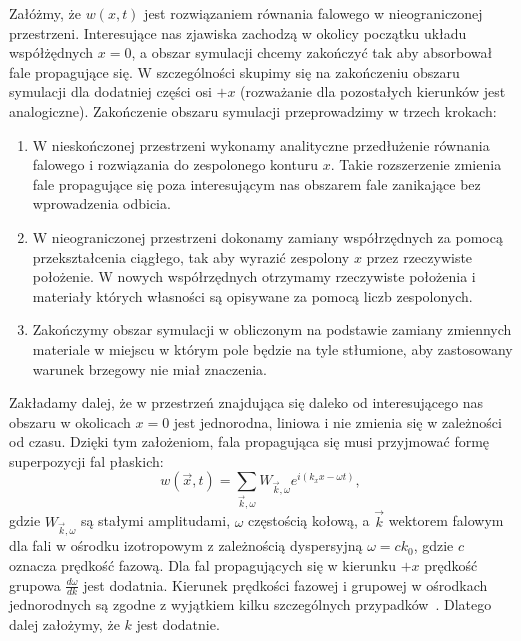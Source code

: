 Załóżmy, że $w(x,t)$ jest rozwiązaniem równania falowego w nieograniczonej przestrzeni. Interesujące nas zjawiska zachodzą w okolicy początku układu współżędnych $x=0$, a obszar symulacji chcemy zakończyć tak aby absorbował fale propagujące się. W szczególności skupimy się na zakończeniu obszaru symulacji dla dodatniej części osi $+x$ (rozważanie dla pozostałych kierunków jest analogiczne). Zakończenie obszaru symulacji przeprowadzimy w trzech krokach:
\begin{enumerate}
	\item W nieskończonej przestrzeni wykonamy analityczne przedłużenie równania falowego i rozwiązania do zespolonego konturu $x$. Takie rozszerzenie zmienia fale propagujące się poza interesującym nas obszarem  fale zanikające bez wprowadzenia odbicia.
	\item W nieograniczonej przestrzeni dokonamy zamiany współrzędnych za pomocą przekształcenia ciągłego, tak aby wyrazić zespolony $x$ przez rzeczywiste położenie. W nowych współrzędnych otrzymamy rzeczywiste położenia i materiały których własności są opisywane za pomocą liczb zespolonych.
	\item Zakończymy obszar symulacji w obliczonym na podstawie zamiany zmiennych materiale w miejscu w którym pole będzie na tyle stłumione, aby zastosowany warunek brzegowy nie miał znaczenia.
\end{enumerate}

Zakładamy dalej, że w przestrzeń znajdująca się daleko od interesującego nas obszaru w okolicach $x=0$ jest jednorodna, liniowa i nie zmienia się w zależności od czasu. Dzięki tym założeniom, fala propagująca się musi przyjmować formę superpozycji fal płaskich:
\begin{equation}
	w(\vec{x},t)= \sum_{\vec{k},\omega} W_{\vec{k},\omega} e^{i (k_x x-\omega t)},
\end{equation}
gdzie $W_{\vec{k},\omega}$ są stałymi amplitudami, $\omega$ częstością kołową, a $\vec{k}$ wektorem falowym dla fali w ośrodku izotropowym z zależnością dyspersyjną $\omega=c k_0$, gdzie $c$ oznacza prędkość fazową. Dla fal propagujących się w kierunku $+x$ prędkość grupowa $\frac{d \omega}{d k}$ jest dodatnia. Kierunek prędkości fazowej i grupowej w ośrodkach jednorodnych są zgodne z wyjątkiem kilku szczególnych przypadków~\cite{teixeira1998general}. Dlatego dalej założymy, że $k$ jest dodatnie. 

